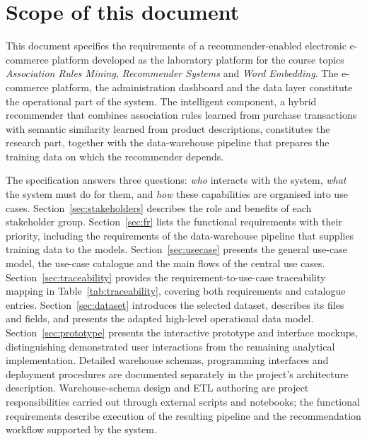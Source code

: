 \documentclass[a4paper,12pt]{article}
\begin{document}
\tableofcontents
\clearpage
\listoffigures
\listoftables
\clearpage
{}

\section*{Scope of this document}

This document specifies the requirements of a recommender-enabled electronic e-commerce platform developed as
the laboratory platform for the course topics \emph{Association Rules Mining}, \emph{Recommender
Systems} and \emph{Word Embedding}. The e-commerce platform, the administration dashboard and the data layer
constitute the operational part of the system. The intelligent component, a hybrid recommender that
combines association rules learned from purchase transactions with semantic similarity learned from
product descriptions, constitutes the research part, together with the data-warehouse pipeline that
prepares the training data on which the recommender depends.

The specification answers three questions: \emph{who} interacts with the system, \emph{what} the
system must do for them, and \emph{how} these capabilities are organised into use cases.
Section~\ref{sec:stakeholders} describes the role and benefits of each stakeholder group.
Section~\ref{sec:fr} lists the functional requirements with their priority, including the
requirements of the data-warehouse pipeline that supplies training data to the models.
Section~\ref{sec:usecase} presents the general use-case model, the use-case catalogue and the main
flows of the central use cases. Section~\ref{sec:traceability} provides the requirement-to-use-case
traceability mapping in Table~\ref{tab:traceability}, covering both requirements and catalogue
entries. Section~\ref{sec:dataset} introduces the selected dataset,
describes its files and fields, and presents the adapted high-level operational data model.
Section~\ref{sec:prototype} presents the interactive prototype and interface mockups,
distinguishing demonstrated user interactions from the remaining analytical implementation.
Detailed warehouse schemas,
programming interfaces and deployment procedures are documented separately in the project's
architecture description. Warehouse-schema design and ETL authoring are project responsibilities
carried out through external scripts and notebooks; the functional requirements describe execution
of the resulting pipeline and the recommendation workflow supported by the system.
\end{document}
